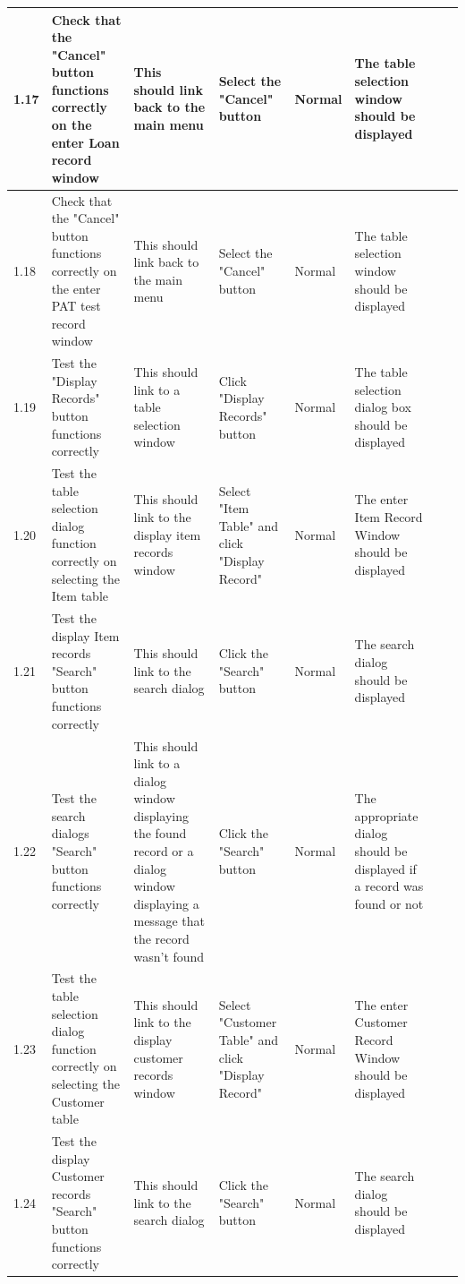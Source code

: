 \begin{landscape}
\begin{center}
\begin{longtable}{|p{1.5cm}|p{2cm}|p{3cm}|p{2cm}|p{2cm}|p{2.5cm}|p{2cm}|p{2cm}|}
        1.17 & Check that the "Cancel" button functions correctly on the enter Loan record window & This should link back to the main menu & Select the "Cancel" 
        button & Normal & The table selection window should be displayed & & \\ \hline
        
        1.18 & Check that the "Cancel" button functions correctly on the enter PAT test record window & This should link back to the main menu & Select the "Cancel" 
        button & Normal & The table selection window should be displayed & & \\ \hline
        
        1.19 & Test the "Display Records" button functions correctly & This should link to a table selection window & Click "Display Records" button & Normal & The 
        table selection dialog box should be displayed & & \\ \hline 

        1.20 & Test the table selection dialog function correctly on selecting the Item table & This should link to the display item records window & Select "Item 
        Table" and click "Display Record" & Normal & The enter Item Record Window should be displayed & & \\ \hline
        
        1.21 & Test the display Item records "Search" button functions correctly & This should link to the search dialog & Click the "Search" button & Normal & The 
        search dialog should be displayed & & \\ \hline
        
        1.22 & Test the search dialogs "Search" button functions correctly & This should link to a dialog window displaying the found record or a dialog window 
        displaying a message that the record wasn't found & Click the "Search" button & Normal & The appropriate dialog should be displayed if a record was found or not
         & & \\ \hline
        
        1.23 & Test the table selection dialog function correctly on selecting the Customer table & This should link to the display customer records window & Select 
        "Customer Table" and click "Display Record" & Normal & The enter Customer Record Window should be displayed & & \\ \hline
        
        1.24 & Test the display Customer records "Search" button functions correctly & This should link to the search dialog & Click the "Search" button & Normal & The 
        search dialog should be displayed & & \\ \hline
        

\end{longtable}
\end{center}
\end{landscape}
